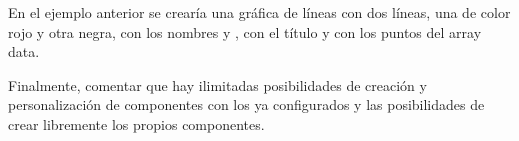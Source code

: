En el ejemplo anterior se crearía una gráfica de líneas con dos líneas, una de color rojo y otra negra, con los nombres  y , con el título  y con los puntos del array data.\bigskip

Finalmente, comentar que hay ilimitadas posibilidades de creación y personalización de componentes con los ya configurados y las posibilidades de crear libremente los propios componentes.
